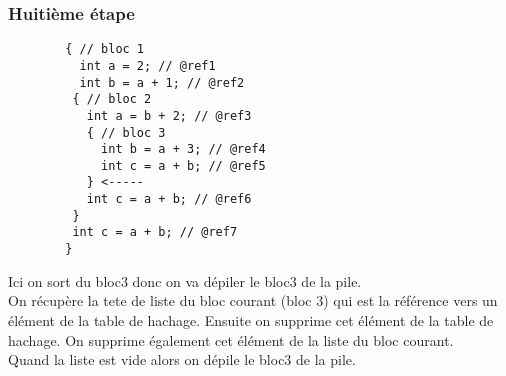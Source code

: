 \documentclass{../../res/univ-projet}
\begin{document}
    \subsubsection{Huitième étape}
    \begin{multicols}{2}
        
        \begin{verbatim}
        { // bloc 1
          int a = 2; // @ref1
          int b = a + 1; // @ref2
         { // bloc 2 
           int a = b + 2; // @ref3
           { // bloc 3
             int b = a + 3; // @ref4
             int c = a + b; // @ref5
           } <-----
           int c = a + b; // @ref6
         }
         int c = a + b; // @ref7
        }

        \end{verbatim}

      \columnbreak
        Ici on sort du bloc3 donc on va dépiler le bloc3 de la pile.\\
        On récupère la tete de liste du bloc courant (bloc 3) qui est la référence vers un élément de la table de hachage. Ensuite on supprime cet élément de la table de hachage. On supprime également cet élément de la liste du bloc courant.\\
        Quand la liste est vide alors on dépile le bloc3 de la pile.
        
        
      \end{multicols}
\end{document}
